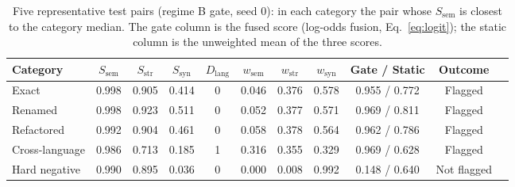 \begin{table}[t]
\centering
\caption{Five representative test pairs (regime B gate, seed 0): in each category the pair whose $S_{\text{sem}}$ is closest to the category median. The gate column is the fused score (log-odds fusion, Eq.~\ref{eq:logit}); the static column is the unweighted mean of the three scores.}
\label{tab:diagnostic-cases}
\footnotesize
\begin{tabular}{lcccccccccl}
\toprule
\textbf{Category} & $S_{\text{sem}}$ & $S_{\text{str}}$ & $S_{\text{syn}}$ & $D_{\text{lang}}$ & $w_{\text{sem}}$ & $w_{\text{str}}$ & $w_{\text{syn}}$ & Gate / Static & Outcome \\
\midrule
Exact & 0.998 & 0.905 & 0.414 & 0 & 0.046 & 0.376 & 0.578 & 0.955 / 0.772 & Flagged \\
Renamed & 0.998 & 0.923 & 0.511 & 0 & 0.052 & 0.377 & 0.571 & 0.969 / 0.811 & Flagged \\
Refactored & 0.992 & 0.904 & 0.461 & 0 & 0.058 & 0.378 & 0.564 & 0.962 / 0.786 & Flagged \\
Cross-language & 0.986 & 0.713 & 0.185 & 1 & 0.316 & 0.355 & 0.329 & 0.969 / 0.628 & Flagged \\
Hard negative & 0.990 & 0.895 & 0.036 & 0 & 0.000 & 0.008 & 0.992 & 0.148 / 0.640 & Not flagged \\
\bottomrule
\end{tabular}
\end{table}
